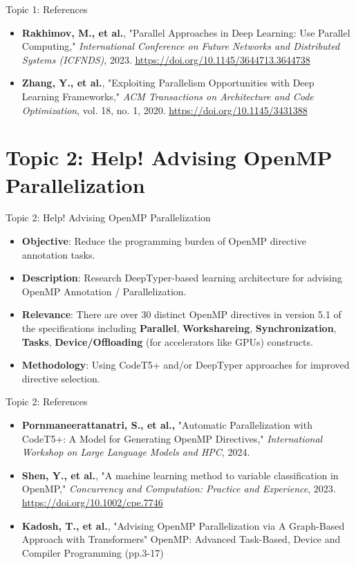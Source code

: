 \documentclass{beamer}
\begin{document}
\begin{frame}{Topic 1: References}
\begin{itemize}
    \item \textbf{Rakhimov, M., et al.}, "Parallel Approaches in Deep Learning: Use Parallel Computing," \textit{International Conference on Future Networks and Distributed Systems (ICFNDS)}, 2023. \url{https://doi.org/10.1145/3644713.3644738}
    \item \textbf{Zhang, Y., et al.}, "Exploiting Parallelism Opportunities with Deep Learning Frameworks," \textit{ACM Transactions on Architecture and Code Optimization}, vol. 18, no. 1, 2020. \url{https://doi.org/10.1145/3431388}

\end{itemize}
\end{frame}

\section{Topic 2: Help! Advising OpenMP Parallelization}
\begin{frame}{Topic 2: Help! Advising OpenMP Parallelization}
\begin{itemize}
    \item \textbf{Objective}: Reduce the programming burden of OpenMP directive annotation tasks.
    \item \textbf{Description}: Research DeepTyper-based learning architecture for advising OpenMP Annotation / Parallelization.
    \item \textbf{Relevance}: There are over 30 distinct OpenMP directives in version 5.1
    of the specifications including \textbf{Parallel}, 
    \textbf{Workshareing}, \textbf{Synchronization}, 
    \textbf{Tasks}, \textbf{Device/Offloading}
    (for accelerators like GPUs) constructs.
    \item \textbf{Methodology}: Using CodeT5+ and/or DeepTyper 
    approaches for improved directive selection.
\end{itemize}
\end{frame}

\begin{frame}{Topic 2: References}
\begin{itemize}
    \item \textbf{Pornmaneerattanatri, S., et al.,} "Automatic Parallelization with CodeT5+: A Model for Generating OpenMP Directives," \textit{International Workshop on Large Language Models and HPC}, 2024.
    \item \textbf{Shen, Y., et al.}, "A machine learning method to variable classification in OpenMP," \textit{Concurrency and Computation: Practice and Experience}, 2023. \url{https://doi.org/10.1002/cpe.7746}
    \item \textbf{Kadosh, T., et al.}, "Advising OpenMP Parallelization via A Graph-Based Approach with Transformers"
    OpenMP: Advanced Task-Based, Device and Compiler Programming (pp.3-17) 
\end{itemize}
\end{frame}
\end{document}

